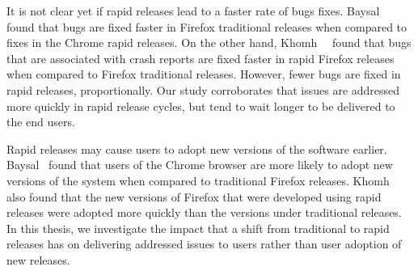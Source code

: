 It is not clear yet if rapid releases lead to a faster rate of bugs fixes.
Baysal~\etal~\cite{baysal2011tale} found that bugs are fixed faster in Firefox
traditional releases when compared to fixes in the Chrome rapid releases. On the
other hand, Khomh~\etal~\cite{khomh2012faster} found that bugs that are
associated with crash reports are fixed faster in rapid Firefox releases when
compared to Firefox traditional releases.  However, fewer bugs are fixed in
rapid releases, proportionally. Our study corroborates that issues are addressed
more quickly in rapid release cycles, but tend to wait longer to be delivered to
the end users.

Rapid releases may cause users to adopt new versions of the software earlier.
Baysal~\etal \cite{baysal2011tale} found that users of the Chrome browser are
more likely to adopt new versions of the system when compared to traditional
Firefox releases. Khomh~\etal \cite{khomh2012faster} also found that the new
versions of Firefox that were developed using rapid releases were adopted more
quickly than the versions under traditional releases. In this thesis, we
investigate the impact that a shift from traditional to rapid releases has on
delivering addressed issues to users rather than user adoption of new releases.

